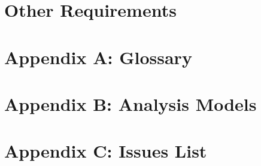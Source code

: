 \documentclass[
]{article}
\begin{document}
\section{Other Requirements}\label{other-requirements}

\section{Appendix A: Glossary}\label{appendix-a-glossary}

\section{Appendix B: Analysis Models}\label{appendix-b-analysis-models}

\section{Appendix C: Issues List}\label{issues-list}
\end{document}
